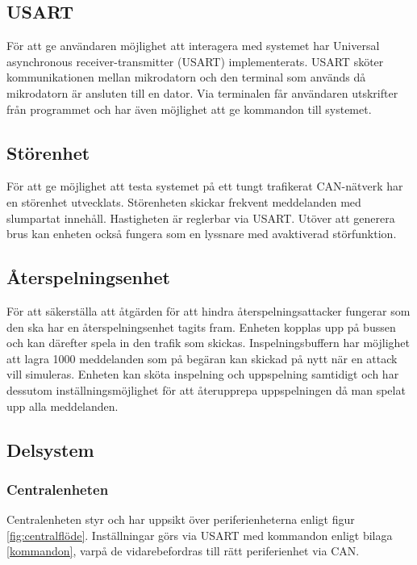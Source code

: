 \documentclass{article}
\begin{document}
\subsection{USART}
För att ge användaren möjlighet att interagera med systemet har Universal asynchronous receiver-transmitter (USART) implementerats. USART sköter kommunikationen mellan mikrodatorn och den terminal som används då mikrodatorn är ansluten till en dator. Via terminalen får användaren utskrifter från programmet och har även möjlighet att ge kommandon till systemet.


\subsection{Störenhet}
För att ge möjlighet att testa systemet på ett tungt trafikerat CAN-nätverk har en störenhet utvecklats. Störenheten skickar frekvent meddelanden med slumpartat innehåll. Hastigheten är reglerbar via USART. Utöver att generera brus kan enheten också fungera som en lyssnare med avaktiverad störfunktion.

\subsection{Återspelningsenhet}
För att säkerställa att åtgärden för att hindra återspelningsattacker fungerar som den ska har en återspelningsenhet tagits fram. Enheten kopplas upp på bussen och kan därefter spela in den trafik som skickas. Inspelningsbuffern har möjlighet att lagra 1000 meddelanden som på begäran kan skickad på nytt när en attack vill simuleras. Enheten kan sköta inspelning och uppspelning samtidigt och har dessutom inställningsmöjlighet för att återupprepa uppspelningen då man spelat upp alla meddelanden.


\subsection{Delsystem }
\subsubsection{Centralenheten}
\label{subsec:centralenhet}

Centralenheten styr och har uppsikt över periferienheterna enligt figur \ref{fig:centralflöde}.
Inställningar görs via USART med kommandon enligt bilaga \ref{kommandon}, varpå de vidarebefordras till rätt periferienhet via CAN.
\end{document}
